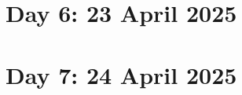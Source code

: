\documentclass{article}
\begin{document}
\section*{Day 6: 23 April 2025}


\section*{Day 7: 24 April 2025}
\end{document}
